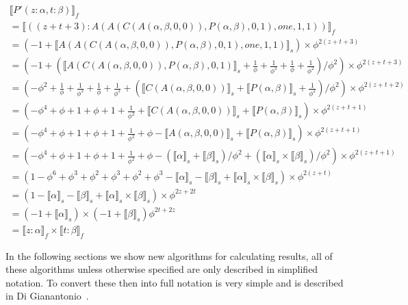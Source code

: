 \documentclass{cs4rep}
\begin{document}
\[ \begin{array}{l}
\llbracket P'(z:\alpha, t:\beta) \rrbracket_{f} \\
= \llbracket ((z+t+3):A(A(C(A(\alpha,\beta,0,0)),P(\alpha,\beta),0,1),one,1,1)) \rrbracket_{f} \\[1ex]
= (-1 + \llbracket A(A(C(A(\alpha,\beta,0,0)),P(\alpha,\beta),0,1),one,1,1) \rrbracket_{s})\times \phi^{2(z+t+3)} \\[1ex]
= (-1 + (\llbracket A(C(A(\alpha,\beta,0,0)),P(\alpha,\beta),0,1) \rrbracket_{s}+\frac{1}{\phi} + \frac{1}{\phi^{2}}+\frac{1}{\phi} + \frac{1}{\phi^{2}})/\phi^{2})\times\phi^{2(z+t+3)} \\[1ex]
=(-\phi^{2}+\frac{1}{\phi} + \frac{1}{\phi^{2}}+\frac{1}{\phi} + \frac{1}{\phi^{2}} + (\llbracket C(A(\alpha,\beta,0,0)) \rrbracket_{s} + \llbracket P(\alpha,\beta) \rrbracket_{s}+\frac{1}{\phi^{2}})/\phi^{2})\times \phi^{2(z+t+2)} \\[1ex]
=(-\phi^{4}+\phi+1+\phi+1+\frac{1}{\phi^{2}}+\llbracket C(A(\alpha,\beta,0,0)) \rrbracket_{s}+\llbracket P(\alpha,\beta) \rrbracket_{s})\times \phi^{2(z+t+1)} \\[1ex]
=(-\phi^{4}+\phi+1+\phi+1+\frac{1}{\phi^{2}}+\phi-\llbracket A(\alpha,\beta,0,0) \rrbracket_{s}+\llbracket P(\alpha,\beta) \rrbracket_{s})\times \phi^{2(z+t+1)} \\[1ex]
=(-\phi^{4}+\phi+1+\phi+1+\frac{1}{\phi^{2}}+\phi-(\llbracket \alpha \rrbracket_{s}+\llbracket \beta \rrbracket_{s})/\phi^{2}+(\llbracket \alpha \rrbracket_{s}\times\llbracket \beta \rrbracket_{s})/\phi^{2})\times \phi^{2(z+t+1)} \\[1ex]
=(1-\phi^{6}+\phi^{3}+\phi^{2}+\phi^{3}+\phi^{2}+\phi^{3}-\llbracket \alpha \rrbracket_{s}-\llbracket \beta \rrbracket_{s}+\llbracket \alpha \rrbracket_{s}\times\llbracket \beta \rrbracket_{s})\times \phi^{2(z+t)} \\[1ex]
=(1-\llbracket \alpha \rrbracket_{s}-\llbracket \beta \rrbracket_{s}+\llbracket \alpha \rrbracket_{s}\times\llbracket \beta \rrbracket_{s})\times \phi^{2z+2t} \\[1ex]
=(-1+\llbracket \alpha \rrbracket_{s}) \times (-1+\llbracket \beta \rrbracket_{s})\phi^{2t+2z} \\[1ex]
=\llbracket z:\alpha \rrbracket_{f}\times\llbracket t:\beta \rrbracket_{f}
\end{array} \]

In the following sections we show new algorithms for calculating
results, all of these algorithms unless otherwise specified are only
described in simplified notation. To convert these then into full
notation is very simple and is described in Di
Gianantonio~\cite{kn:DiGianantonio}.
\end{document}
